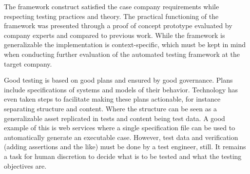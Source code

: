 \documentclass[12pt,a4paper,oneside,pdftex]{report}
\begin{document}
{The framework construct satisfied the case company requirements while respecting testing practices and theory. The practical functioning of the framework was presented through a proof of concept prototype evaluated by company experts and compared to previous work. While the framework is generalizable the implementation is context-specific, which must be kept in mind when conducting further evaluation of the automated testing framework at the target company.

Good testing is based on good plans and ensured by good governance. Plans include specifications of systems and models of their behavior. Technology has even taken steps to facilitate making these plans actionable, for instance separating structure and content. Where the structure can be seen as a generalizable asset replicated in tests and content being test data. A good example of this is web services where a single specification file can be used to automatically generate an executable case. However, test data and verification (adding assertions and the like) must be done by a test engineer, still. It remains a task for human discretion to decide what is to be tested and what the testing objectives are.


\begin{comment}
Inconsistent interpretation of parameters or values
Violations of value domains or of capacity or size limits
Side-effects on parameters or resrouces
Missing or misunderstood functionality
Nonfinctional problems
Dynamic mismatches
\end{comment}

\begin{comment}
Interpretation
    wrong function - something else than specified
    extra function - more than what is expected/needed
    missing function - not all that is specified
Miscoded call (error which causes the developer to place the call instruction at the wrong point in the program)
    Extra instruction fault: the call instruction is on a path which should not have the call.
    Wrong placement fault: the call is at the wrong location on the path which should have the call instruction.
    Missing instruction fault: the call instruction is missing on the path which should have the call.
Interface error
    When stardards or agreements are violated
\end{comment}

}
\end{document}

